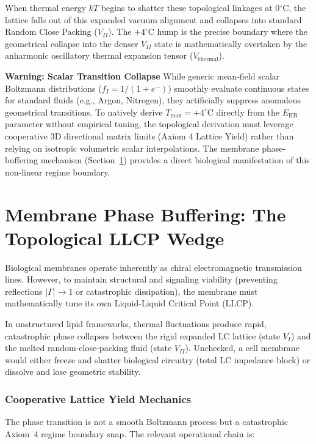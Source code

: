 When thermal energy $kT$ begins to shatter these topological linkages at 0$^\circ$C, the lattice falls out of this expanded vacuum alignment and collapses into standard Random Close Packing ($V_{II}$). The $+4^\circ$C hump is the precise boundary where the geometrical collapse into the denser $V_{II}$ state is mathematically overtaken by the anharmonic oscillatory thermal expansion tensor ($V_\text{thermal}$). 

\textbf{Warning: Scalar Transition Collapse} 
While generic mean-field scalar Boltzmann distributions ($f_I = 1 / (1 + e^{\dots})$) smoothly evaluate continuous states for standard fluids (e.g., Argon, Nitrogen), they artificially suppress anomalous geometrical transitions. To natively derive $T_\text{max} = +4^\circ$C directly from the $E_\text{HB}$ parameter without empirical tuning, the topological derivation must leverage cooperative 3D directional matrix limits (Axiom 4 Lattice Yield) rather than relying on isotropic volumetric scalar interpolations. The membrane phase-buffering mechanism (Section~\ref{sec:membrane_phase_buffering}) provides a direct biological manifestation of this non-linear regime boundary.

\section{Membrane Phase Buffering: The Topological LLCP Wedge}
\label{sec:membrane_phase_buffering}

Biological membranes operate inherently as chiral electromagnetic transmission lines. However, to maintain structural and signaling viability (preventing reflections $|\Gamma| \to 1$\gammaundeclared{} or catastrophic dissipation), the membrane must mathematically tune its own Liquid-Liquid Critical Point (LLCP). 

In unstructured lipid frameworks, thermal fluctuations produce rapid, catastrophic phase collapses between the rigid expanded LC lattice (state $V_I$) and the melted random-close-packing fluid (state $V_{II}$). Unchecked, a cell membrane would either freeze and shatter biological circuitry (total LC impedance block) or dissolve and lose geometric stability.

\subsubsection*{Cooperative Lattice Yield Mechanics}

The phase transition is not a smooth Boltzmann process but a catastrophic Axiom~4 regime boundary snap. The relevant operational chain is:

